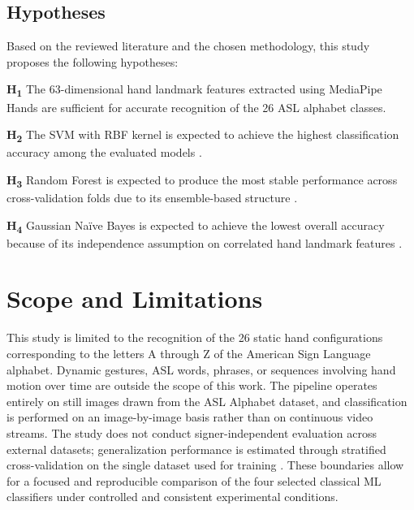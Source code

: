 \documentclass[12pt,runningheads]{llncs}
\begin{document}
\subsection{Hypotheses}

Based on the reviewed literature and the chosen methodology, this study proposes the following hypotheses:

\textbf{H\textsubscript{1}} The 63-dimensional hand landmark features extracted using MediaPipe Hands \cite{zhang2020} are sufficient for accurate recognition of the 26 ASL alphabet classes.

\textbf{H\textsubscript{2}} The SVM with RBF kernel is expected to achieve the highest classification accuracy among the evaluated models \cite{barczak2011,isaacs2004}.

\textbf{H\textsubscript{3}} Random Forest is expected to produce the most stable performance across cross-validation folds due to its ensemble-based structure \cite{pugeault2011}.

\textbf{H\textsubscript{4}} Gaussian Na\"{i}ve Bayes is expected to achieve the lowest overall accuracy because of its independence assumption on correlated hand landmark features \cite{rish2001}.
\section{Scope and Limitations}

This study is limited to the recognition of the 26 static hand configurations corresponding to the letters A through Z of the American Sign Language alphabet. Dynamic gestures, ASL words, phrases, or sequences involving hand motion over time are outside the scope of this work. The pipeline operates entirely on still images drawn from the ASL Alphabet dataset, and classification is performed on an image-by-image basis rather than on continuous video streams. The study does not conduct signer-independent evaluation across external datasets; generalization performance is estimated through stratified cross-validation on the single dataset used for training \cite{adeyanju2021}. These boundaries allow for a focused and reproducible comparison of the four selected classical ML classifiers under controlled and consistent experimental conditions.

\end{document}
